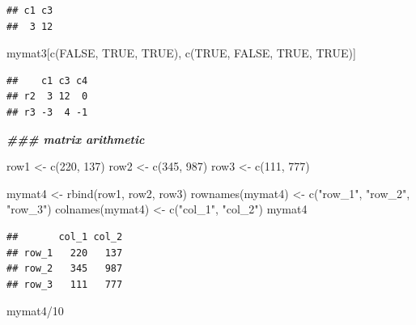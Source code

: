 \documentclass[
]{book}
\newenvironment{Shaded}{\begin{snugshade}}{\end{snugshade}}
\newcommand{\ConstantTok}[1]{\textcolor[rgb]{0.00,0.00,0.00}{#1}}
\newcommand{\DecValTok}[1]{\textcolor[rgb]{0.00,0.00,0.81}{#1}}
\newcommand{\DocumentationTok}[1]{\textcolor[rgb]{0.56,0.35,0.01}{\textbf{\textit{#1}}}}
\newcommand{\FunctionTok}[1]{\textcolor[rgb]{0.00,0.00,0.00}{#1}}
\newcommand{\NormalTok}[1]{#1}
\newcommand{\OtherTok}[1]{\textcolor[rgb]{0.56,0.35,0.01}{#1}}
\newcommand{\SpecialCharTok}[1]{\textcolor[rgb]{0.00,0.00,0.00}{#1}}
\newcommand{\StringTok}[1]{\textcolor[rgb]{0.31,0.60,0.02}{#1}}
\begin{document}
\begin{verbatim}
## c1 c3 
##  3 12
\end{verbatim}

\begin{Shaded}
\begin{Highlighting}[]
\NormalTok{mymat3[}\FunctionTok{c}\NormalTok{(}\ConstantTok{FALSE}\NormalTok{, }\ConstantTok{TRUE}\NormalTok{, }\ConstantTok{TRUE}\NormalTok{),}
       \FunctionTok{c}\NormalTok{(}\ConstantTok{TRUE}\NormalTok{, }\ConstantTok{FALSE}\NormalTok{, }\ConstantTok{TRUE}\NormalTok{, }\ConstantTok{TRUE}\NormalTok{)]}
\end{Highlighting}
\end{Shaded}

\begin{verbatim}
##    c1 c3 c4
## r2  3 12  0
## r3 -3  4 -1
\end{verbatim}

\begin{Shaded}
\begin{Highlighting}[]
\DocumentationTok{\#\#\# matrix arithmetic}

\NormalTok{row1 }\OtherTok{\textless{}{-}} \FunctionTok{c}\NormalTok{(}\DecValTok{220}\NormalTok{, }\DecValTok{137}\NormalTok{)}
\NormalTok{row2 }\OtherTok{\textless{}{-}} \FunctionTok{c}\NormalTok{(}\DecValTok{345}\NormalTok{, }\DecValTok{987}\NormalTok{)}
\NormalTok{row3 }\OtherTok{\textless{}{-}} \FunctionTok{c}\NormalTok{(}\DecValTok{111}\NormalTok{, }\DecValTok{777}\NormalTok{)}

\NormalTok{mymat4 }\OtherTok{\textless{}{-}} \FunctionTok{rbind}\NormalTok{(row1, row2, row3)}
\FunctionTok{rownames}\NormalTok{(mymat4) }\OtherTok{\textless{}{-}} \FunctionTok{c}\NormalTok{(}\StringTok{"row\_1"}\NormalTok{, }\StringTok{"row\_2"}\NormalTok{, }\StringTok{"row\_3"}\NormalTok{)}
\FunctionTok{colnames}\NormalTok{(mymat4) }\OtherTok{\textless{}{-}} \FunctionTok{c}\NormalTok{(}\StringTok{"col\_1"}\NormalTok{, }\StringTok{"col\_2"}\NormalTok{)}
\NormalTok{mymat4}
\end{Highlighting}
\end{Shaded}

\begin{verbatim}
##       col_1 col_2
## row_1   220   137
## row_2   345   987
## row_3   111   777
\end{verbatim}

\begin{Shaded}
\begin{Highlighting}[]
\NormalTok{mymat4}\SpecialCharTok{/}\DecValTok{10}
\end{Highlighting}
\end{Shaded}
\end{document}

